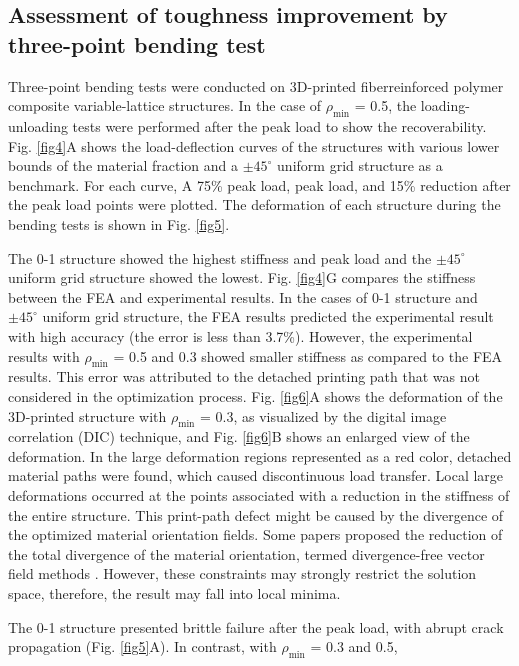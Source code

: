 \documentclass[a4paper,7pt,fleqn]{article}   %
\begin{document}
\begin{multicols}{2}
		\subsection{Assessment of toughness improvement by three-point bending test}
		Three-point bending tests were conducted on 3D-printed fiberreinforced
		polymer composite variable-lattice structures. In the case of
		$\rho_{\min}$ = 0.5, the loading-unloading tests were performed after the peak
		load to show the recoverability. Fig. \ref{fig4}A shows the load-deflection curves
		of the structures with various lower bounds of the material fraction and
		a $\pm45^{\circ}$ uniform grid structure as a benchmark. For each curve, A 75\%
		peak load, peak load, and 15\% reduction after the peak load points were
		plotted. The deformation of each structure during the bending tests is
		shown in Fig. \ref{fig5}.    \par    %
		The 0-1 structure showed the highest stiffness and peak load and the
		$\pm45^{\circ}$ uniform grid structure showed the lowest. Fig. \ref{fig4}G compares the
		stiffness between the FEA and experimental results. In the cases of 0-1
		structure and $\pm45^{\circ}$ uniform grid structure, the FEA results predicted the
		experimental result with high accuracy (the error is less than 3.7\%).
		However, the experimental results with $\rho_{\min}$ = 0.5 and 0.3 showed
		smaller stiffness as compared to the FEA results. This error was attributed
		to the detached printing path that was not considered in the optimization
		process. Fig. \ref{fig6}A shows the deformation of the 3D-printed
		structure with $\rho_{\min}$ = 0.3, as visualized by the digital image correlation
		(DIC) technique, and Fig. \ref{fig6}B shows an enlarged view of the deformation.
		In the large deformation regions represented as a red color,
		detached material paths were found, which caused discontinuous load
		transfer. Local large deformations occurred at the points associated with
		a reduction in the stiffness of the entire structure. This print-path defect
		might be caused by the divergence of the optimized material orientation
		fields. Some papers proposed the reduction of the total divergence of the
		material orientation, termed divergence-free vector field methods \cite{r28}.
		However, these constraints may strongly restrict the solution space,
		therefore, the result may fall into local minima.     \par    %
		The 0-1 structure presented brittle failure after the peak load, with
		abrupt crack propagation (Fig. \ref{fig5}A). In contrast, with $\rho_{\min}$ = 0.3 and 0.5,

\end{multicols}
\end{document}
